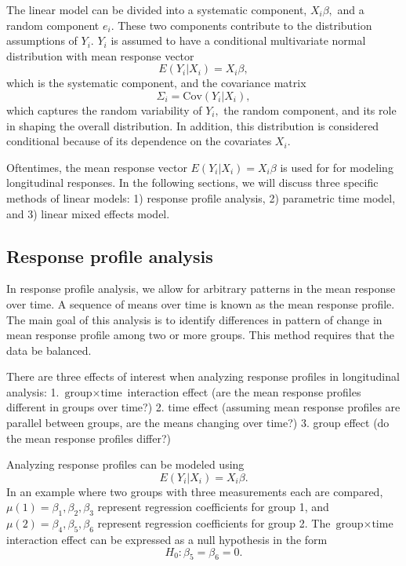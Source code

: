 \documentclass[12pt, twoside]{amherstthesis}
\begin{document}
The linear model can be divided into a systematic component, \(X_i\beta,\) and a random component \(e_i.\) These two components contribute to the distribution assumptions of \(Y_i.\) \(Y_i\) is assumed to have a conditional multivariate normal distribution with mean response vector \[E(Y_i|X_i) = X_i\beta,\] which is the systematic component, and the covariance matrix \[\Sigma_i = \text{Cov}(Y_i|X_i),\] which captures the random variability of \(Y_i,\) the random component, and its role in shaping the overall distribution. In addition, this distribution is considered conditional because of its dependence on the covariates \(X_i.\)

Oftentimes, the mean response vector \(E(Y_i|X_i) = X_i\beta\) is used for for modeling longitudinal responses. In the following sections, we will discuss three specific methods of linear models: 1) response profile analysis, 2) parametric time model, and 3) linear mixed effects model.

\hypertarget{response-profile-analysis}{%
\subsection{Response profile analysis}\label{response-profile-analysis}}

In response profile analysis, we allow for arbitrary patterns in the mean response over time. A sequence of means over time is known as the mean response profile. The main goal of this analysis is to identify differences in pattern of change in mean response profile among two or more groups. This method requires that the data be balanced.

There are three effects of interest when analyzing response profiles in longitudinal analysis:
1. \(\text{group} \times \text{time}\) interaction effect (are the mean response profiles different in groups over time?)
2. time effect (assuming mean response profiles are parallel between groups, are the means changing over time?)
3. group effect (do the mean response profiles differ?)

Analyzing response profiles can be modeled using \[E(Y_i|X_i) = X_i\beta.\] In an example where two groups with three measurements each are compared, \(\mu(1) = \beta_1,\beta_2,\beta_3\) represent regression coefficients for group 1, and \(\mu(2) = \beta_4,\beta_5,\beta_6\) represent regression coefficients for group 2. The \(\text{group} \times \text{time}\) interaction effect can be expressed as a null hypothesis in the form \[H_0: \beta_5 =\beta_6=0.\]
\end{document}
